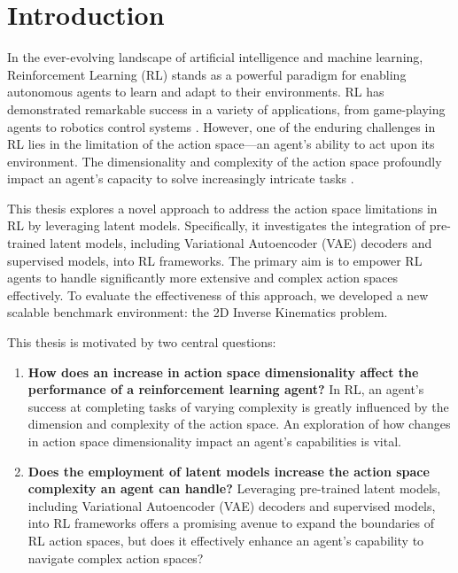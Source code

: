 \chapter{Introduction}\label{chap:introduction}




In the ever-evolving landscape of artificial intelligence and machine learning, Reinforcement Learning (RL) stands as a powerful paradigm for enabling autonomous agents to learn and adapt to their environments. RL has demonstrated remarkable success in a variety of applications, from game-playing agents \cite{SAC_VideoGames_Paper} to robotics control systems \cite{SAC_Applications_Paper} \cite{anymal_RL}. However, one of the enduring challenges in RL lies in the limitation of the action space—an agent's ability to act upon its environment. The dimensionality and complexity of the action space profoundly impact an agent's capacity to solve increasingly intricate tasks \cite{RL_Complex_Action_Spaces}.

This thesis explores a novel approach to address the action space limitations in RL by leveraging latent models. Specifically, it investigates the integration of pre-trained latent models, including Variational Autoencoder (VAE) decoders and supervised models, into RL frameworks. The primary aim is to empower RL agents to handle significantly more extensive and complex action spaces effectively. To evaluate the effectiveness of this approach, we developed a new scalable benchmark environment: the 2D Inverse Kinematics problem.

This thesis is motivated by two central questions:

\begin{enumerate}
    \item \textbf{How does an increase in action space dimensionality affect the performance of a reinforcement learning agent?} In RL, an agent's success at completing tasks of varying complexity is greatly influenced by the dimension and complexity of the action space. An exploration of how changes in action space dimensionality impact an agent's capabilities is vital. 
    \item \textbf{Does the employment of latent models increase the action space complexity an agent can handle?} Leveraging pre-trained latent models, including Variational Autoencoder (VAE) decoders and supervised models, into RL frameworks offers a promising avenue to expand the boundaries of RL action spaces, but does it effectively enhance an agent's capability to navigate complex action spaces?
\end{enumerate}



